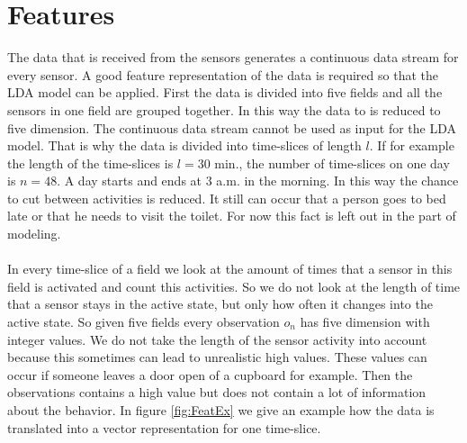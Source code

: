 \documentclass[a4paper,fleqn]{article}
\begin{document}
\section{Features}
\label{sec:features}
The data that is received from the sensors generates a continuous data stream for every sensor. A good feature representation of the data is required so that the LDA model can be applied.
First the data is divided into five fields and all the sensors in one field are grouped together. In this way the data to is reduced to five dimension. The continuous data stream cannot be used as input for the LDA model. That is why the data is divided into time-slices of length $l$. If for example the length of the time-slices is $l=30$ min., the number of time-slices on one day is $n=48$.
A day starts and ends at 3 a.m. in the morning. In this way the chance to cut between activities is reduced. It still can occur that a person goes to bed late or that he needs to visit the toilet. For now this fact is left out in the part of modeling.\\
\\
In every time-slice of a field we look at the amount of times that a sensor in this field is activated and count this activities. So we do not look at the length of time that a sensor stays in the active state, but only how often it changes into the active state. So given five fields every observation $o_n$ has five dimension with integer values.
We do not take the length of the sensor activity into account because this sometimes can lead to unrealistic high values. These values can occur if someone leaves a door open of a cupboard for example. Then the observations contains a high value but does not contain a lot of information about the behavior. In figure \ref{fig:FeatEx} we give an example how the data is translated into a vector representation for one time-slice.%
\end{document}
